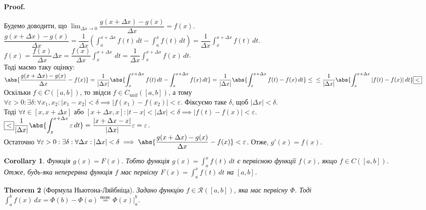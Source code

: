 \documentclass[a4paper, 10pt]{article}
\makeatletter
\def\huge{\displaystyle}
\def\qed{$\blacksquare$}
\theoremstyle{theoremdd}
\newtheorem{theorem}{Theorem}[subsection]
\theoremstyle{theoremdd}
\theoremstyle{theoremdd}
\theoremstyle{theoremdd}
\theoremstyle{theoremdd}
\theoremstyle{theoremdd}
\theoremstyle{theoremdd}
\theoremstyle{theoremdd}
\theoremstyle{theoremdd}
\newtheorem{corollary}[theorem]{Corollary}
\renewenvironment{proof}[1][Proof.\\]{\par
\pushQED{\hfill \qed}%
\normalfont \topsep6\p@\@plus6\p@\relax
\trivlist
\item\relax
{\bfseries
#1\@addpunct{.}}\hspace\labelsep\ignorespaces
}{%
\popQED\endtrivlist\@endpefalse
}
\makeatother
\begin{document}
\begin{proof}
Будемо доводити, що $\huge\lim_{\Delta x \to 0} \dfrac{g(x+\Delta x) - g(x)}{\Delta x} = f(x)$.\\
$\dfrac{g(x+\Delta x)-g(x)}{\Delta x} = \dfrac{1}{\Delta x} \huge \left( \int_a^{x+\Delta x} f(t)\,dt - \int_a^x f(t)\,dt \right) = \dfrac{1}{\Delta x} \int_x^{x+\Delta x} f(t)\,dt$.\\
$f(x) = \dfrac{f(x)}{\Delta x} \Delta x = \dfrac{f(x)}{\Delta x} \huge\int_x^{x+\Delta x} \,dt = \dfrac{1}{\Delta x} \int_x^{x+\Delta x} f(x)\,dt$.\\
Тоді маємо таку оцінку:\\
$\huge \abs{\dfrac{g(x+\Delta x) - g(x)}{\Delta x} - f(x)} = \dfrac{1}{|\Delta x|} \abs{\int_x^{x+\Delta x} f(t)\,dt - \int_x^{x+\Delta x} f(x)\,dt} = \dfrac{1}{|\Delta x|} \abs{\int_x^{x+\Delta x} f(t)-f(x)\,dt} \leq \\ \leq \dfrac{1}{|\Delta x|} \abs{\int_x^{x+\Delta x} |f(t)-f(x)|\,dt} \boxed{<}$\\
Оскільки $f \in C([a,b])$, то звідси $f \in C_{\text{unif}}([a,b])$, а тому\\
$\forall \varepsilon > 0: \exists \delta: \forall x_1,x_2: |x_1-x_2| < \delta \implies |f(x_1)-f(x_2)| < \varepsilon$.
Фіксуємо таке $\delta$, щоб $|\Delta x| < \delta$.\\
Тоді $\forall t \in [x,x+\Delta x]$ або $[x+\Delta x,x]: |t-x| < |\Delta x| < \delta \implies |f(t)-f(x)| < \varepsilon$.\\
$\boxed{<} \dfrac{1}{|\Delta x|} \huge \abs{\int_x^{x+\Delta x} \varepsilon \,dt} = \dfrac{|x+\Delta x - x|}{|\Delta x|} \varepsilon = \varepsilon$.\\
Остаточно $\forall \varepsilon > 0: \exists \delta: \forall \Delta x: |\Delta x| < \delta \implies \abs{\dfrac{g(x+\Delta x) - g(x)}{\Delta x} - f(x)} < \varepsilon$. Отже, $g'(x) = f(x)$.
\end{proof}

\begin{corollary}
Функція $g(x) = F(x)$. Тобто функція $g(x) = \huge\int_a^x f(t)\,dt$ є первісною функції $f(x)$, якщо $f \in C([a,b])$.\\
Отже, будь-яка неперервна функція $f$ має первісну $F(x) = \huge\int_a^x f(t)\,dt$ на $[a,b]$.
\end{corollary}

\begin{theorem}[Формула Ньютона-Ляйбніца]
Задано функцію $f \in \mathcal{R}([a,b])$, яка має первісну $\Phi$. Тоді $\huge\int_a^b f(x)\,dx = \Phi(b) - \Phi(a) \overset{\text{позн.}}{=} \Phi(x)\Big|_a^b$.
\end{theorem}
\end{document}
